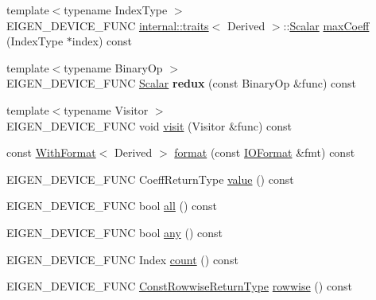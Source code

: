 \begin{DoxyCompactItemize}
\item 
{\footnotesize template$<$typename Index\+Type $>$ }\\E\+I\+G\+E\+N\+\_\+\+D\+E\+V\+I\+C\+E\+\_\+\+F\+U\+NC \mbox{\hyperlink{struct_eigen_1_1internal_1_1traits}{internal\+::traits}}$<$ Derived $>$\+::\mbox{\hyperlink{class_eigen_1_1_dense_base_a5feed465b3a8e60c47e73ecce83e39a2}{Scalar}} \mbox{\hyperlink{class_eigen_1_1_dense_base_ac7f03010f4e0891c90cdcfe123f45223}{max\+Coeff}} (Index\+Type $\ast$index) const
\item 
\mbox{\label{class_eigen_1_1_dense_base_abeb8cc034b4c9c2e36a15590d24a461c}} 
{\footnotesize template$<$typename Binary\+Op $>$ }\\E\+I\+G\+E\+N\+\_\+\+D\+E\+V\+I\+C\+E\+\_\+\+F\+U\+NC \mbox{\hyperlink{class_eigen_1_1_dense_base_a5feed465b3a8e60c47e73ecce83e39a2}{Scalar}} {\bfseries redux} (const Binary\+Op \&func) const
\item 
{\footnotesize template$<$typename Visitor $>$ }\\E\+I\+G\+E\+N\+\_\+\+D\+E\+V\+I\+C\+E\+\_\+\+F\+U\+NC void \mbox{\hyperlink{class_eigen_1_1_dense_base_a7f73df3954a09c7ab0dca208b6b23ddd}{visit}} (Visitor \&func) const
\item 
const \mbox{\hyperlink{class_eigen_1_1_with_format}{With\+Format}}$<$ Derived $>$ \mbox{\hyperlink{class_eigen_1_1_dense_base_ab231f1a6057f28d4244145e12c9fc0c7}{format}} (const \mbox{\hyperlink{struct_eigen_1_1_i_o_format}{I\+O\+Format}} \&fmt) const
\item 
E\+I\+G\+E\+N\+\_\+\+D\+E\+V\+I\+C\+E\+\_\+\+F\+U\+NC Coeff\+Return\+Type \mbox{\hyperlink{class_eigen_1_1_dense_base_a8da735a6bfc7012606acf787156d10a0}{value}} () const
\item 
E\+I\+G\+E\+N\+\_\+\+D\+E\+V\+I\+C\+E\+\_\+\+F\+U\+NC bool \mbox{\hyperlink{class_eigen_1_1_dense_base_ae42ab60296c120e9f45ce3b44e1761a4}{all}} () const
\item 
E\+I\+G\+E\+N\+\_\+\+D\+E\+V\+I\+C\+E\+\_\+\+F\+U\+NC bool \mbox{\hyperlink{class_eigen_1_1_dense_base_abfbf4cb72dd577e62fbe035b1c53e695}{any}} () const
\item 
E\+I\+G\+E\+N\+\_\+\+D\+E\+V\+I\+C\+E\+\_\+\+F\+U\+NC Index \mbox{\hyperlink{class_eigen_1_1_dense_base_a229be090c665b9bf7d1fcdfd1ab6e0c1}{count}} () const
\item 
E\+I\+G\+E\+N\+\_\+\+D\+E\+V\+I\+C\+E\+\_\+\+F\+U\+NC \mbox{\hyperlink{class_eigen_1_1_vectorwise_op}{Const\+Rowwise\+Return\+Type}} \mbox{\hyperlink{class_eigen_1_1_dense_base_af9662cd704ffc16c5b88c7b2d331576f}{rowwise}} () const

\end{DoxyCompactItemize}
